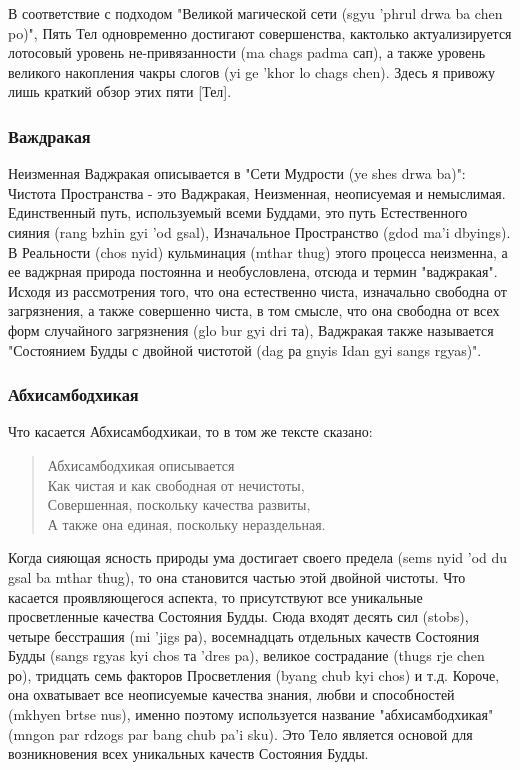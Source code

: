 В соответствие с подходом "Великой магической сети (sgyu 'phrul drwa ba chen po)",
Пять Тел одновременно достигают совершенства, кактолько актуализируется лотосовый
уровень не-привязанности (ma chags padma сап), а также уровень великого накопления
чакры слогов (yi ge 'khor lo chags chen). Здесь я привожу лишь краткий обзор этих пяти [Тел].\\

\subsubsection{Важдракая}

Неизменная Ваджракая описывается в "Сети Мудрости (ye shes drwa ba)":
Чистота Пространства - это Ваджракая,
Неизменная, неописуемая и немыслимая.
Единственный путь, используемый всеми Буддами, это путь Естественного сияния
(rang bzhin gyi 'od gsal), Изначальное Пространство (gdod ma'i dbyings). В Реальности (chos
nyid) кульминация (mthar thug) этого процесса неизменна, а ее ваджрная природа постоянна
и необусловлена, отсюда и термин "ваджракая". Исходя из рассмотрения того, что она
естественно чиста, изначально свободна от загрязнения, а также совершенно чиста, в том
смысле, что она свободна от всех форм случайного загрязнения (glo bur gyi dri та),
Ваджракая также называется "Состоянием Будды с двойной чистотой (dag ра gnyis Idan gyi
sangs rgyas)".

\subsubsection{Абхисамбодхикая}

Что касается Абхисамбодхикаи, то в том же тексте сказано:

\begin{verse}
Абхисамбодхикая описывается\\
Как чистая и как свободная от нечистоты,\\
Совершенная, поскольку качества развиты,\\
А также она единая, поскольку нераздельная.
\end{verse}

Когда сияющая ясность природы ума достигает своего предела (sems nyid 'od du gsal
ba mthar thug), то она становится частью этой двойной чистоты. Что касается
проявляющегося аспекта, то присутствуют все уникальные просветленные качества
Состояния Будды. Сюда входят десять сил (stobs), четыре бесстрашия (mi 'jigs ра),
восемнадцать отдельных качеств Состояния Будды (sangs rgyas kyi chos та 'dres pa), великое
сострадание (thugs rje chen ро), тридцать семь факторов Просветления (byang chub kyi chos) и
т.д. Короче, она охватывает все неописуемые качества знания, любви и способностей
(mkhyen brtse nus), именно поэтому используется название "абхисамбодхикая" (mngon par
rdzogs par bang chub pa'i sku). Это Тело является основой для возникновения всех
уникальных качеств Состояния Будды.

